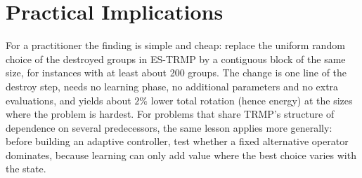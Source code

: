 \section{Practical Implications}

For a practitioner the finding is simple and cheap: replace the uniform random choice of the destroyed groups in ES-TRMP by a contiguous block of the same size, for instances with at least about 200 groups. The change is one line of the destroy step, needs no learning phase, no additional parameters and no extra evaluations, and yields about $2\%$ lower total rotation (hence energy) at the sizes where the problem is hardest. For problems that share TRMP's structure of dependence on several predecessors, the same lesson applies more generally: before building an adaptive controller, test whether a fixed alternative operator dominates, because learning can only add value where the best choice varies with the state.
